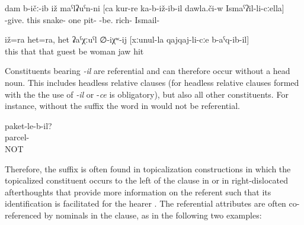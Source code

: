 \begin{exe}
	\ex	\label{ex:The snake who sat in a pit together with the rich}
	\gll	dam	b-ičː-ib	iž	maˁlʡuˁn-ni	[ca	kur-re	ka-b-iž-ib-il	dawla.či-w	Ismaˁʔil-li-cːella]	\\
			-give.	this	snake-	one	pit-	-be.	rich-	Ismail-\\
	\glt	{}

	\ex	\label{ex:‎This also and this also is probably the man}
	\gll	iž=ra	het=ra,	het	ʡaˁχːuˁl	∅-iχʷ-ij	[xːunul-la	qajqaj-li-cːe	b-aˁq-ib-il]\\
		this	that	that	guest	be	woman	jaw	hit\\
	\glt	{}
	
\end{exe}


Constituents bearing \textit{-il} are referential and can therefore occur without a head noun. This includes headless relative clauses (for headless relative clauses formed with the  the use of \textit{-il} or -\textit{ce} is obligatory), but also all other constituents. For instance, without the suffix the word in  would not be referential.

\begin{exe}
	\ex	\label{ex:The (thing) in the parcel?}
	\gll	paket-le-b-il?\\
		parcel-\\
	\glt	{} NOT 
\end{exe}

Therefore, the suffix is often found in topicalization constructions in which the topicalized constituent occurs to the left of the clause in  or in right-dislocated afterthoughts that provide more information on the referent such that its identification is facilitated for the hearer . The referential attributes are often co-referenced by nominals in the clause, as in the following two examples:

